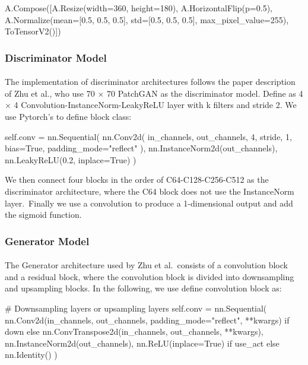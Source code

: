 \begin{python}
A.Compose([A.Resize(width=360, height=180),
                    A.HorizontalFlip(p=0.5),
                    A.Normalize(mean=[0.5, 0.5, 0.5],
                                std=[0.5, 0.5, 0.5], 
                                max_pixel_value=255),
                    ToTensorV2()])
\end{python}

\subsubsection{Discriminator Model}
\paragraph{}
The implementation of discriminator architectures follows the paper description of Zhu et al., who use 70 $\times$ 70 PatchGAN as the discriminator model. Define  as 4 $\times$ 4 Convolution-InstanceNorm-LeakyReLU layer with k filters and stride 2. We use Pytorch's  to define  block class:

\begin{python}
self.conv = nn.Sequential(
    nn.Conv2d(
        in_channels, 
        out_channels,
        4, 
        stride, 
        1, 
        bias=True,
        padding_mode="reflect"
    ),
    nn.InstanceNorm2d(out_channels),
    nn.LeakyReLU(0.2, inplace=True)
)
\end{python}

We then connect four  blocks in the order of C64-C128-C256-C512 as the discriminator architecture, where the C64 block does not use the InstanceNorm layer.\ Finally we use a convolution to produce a 1-dimensional output and add the sigmoid function.

\subsubsection{Generator Model}
\paragraph{}
The Generator architecture used by Zhu et al.\  consists of a convolution block and a residual block, where the convolution block is divided into downsampling and upsampling blocks. In the following, we use  define convolution block as:

\begin{python}
# Downsampling layers or upsampling layers
self.conv = nn.Sequential(
    nn.Conv2d(in_channels, 
              out_channels, 
              padding_mode="reflect", 
              **kwargs) 
              if down
              else 
              nn.ConvTranspose2d(in_channels,
                                 out_channels, 
                                 **kwargs),
    nn.InstanceNorm2d(out_channels),
    nn.ReLU(inplace=True) if use_act else nn.Identity()
)
\end{python}

